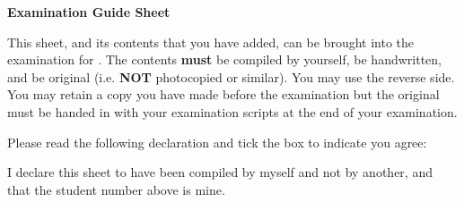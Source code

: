 \documentclass[12pt,a4paper]{article}
\newif\ifShowBarcode
\begin{document}
\begin{center}
\textbf{\ModuleCode{} Examination Guide Sheet}\par\medskip

This sheet, and its contents that you have added, can be brought into
the examination for \ModuleCode. The contents \textbf{must} be compiled
by yourself, be handwritten, and be original (i.e. \textbf{NOT}
photocopied or similar). You may use the
reverse side. You may retain a copy you have made before the examination
but the original must be handed in with your examination scripts at the
end of your examination.
\end{center}

\begin{flushright}
\ifShowBarcode
  \barcode[code=Code39,X=.4mm,ratio=2.5,H=1cm]{\StudentNumber}\par
\fi
\texttt{\large\StudentNumber}
\end{flushright}

\vfill
\begin{center}
Please read the following declaration and tick the box to indicate you agree:

I declare this sheet to have been compiled by myself and not by another, and that the student number above is mine.

\framebox[0.3 cm]{ }
\end{center}
\end{document}
